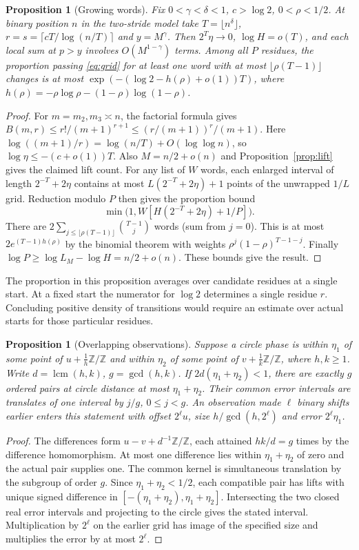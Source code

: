 \documentclass[11pt]{article}
\newtheorem{proposition}[theorem]{Proposition}
\DeclareMathOperator{\lcm}{lcm}
\newcommand{\Z}{\mathbb Z}
\begin{document}
\begin{proposition}[Growing words]\label{prop:entropy}
Fix $0<\gamma<\delta<1$, $c>\log 2$, $0<\rho<1/2$.
At binary position $n$ in the two-stride model take $T=\lfloor n^\delta\rfloor$,
$r=s=\lceil cT/\log(n/T)\rceil$ and $y=M^\gamma$. Then
$2^T\eta\to0$, $\log H=o(T)$, and each local sum at $p>y$ involves
$O(M^{1-\gamma})$ terms. Among all $P$ residues, the proportion passing
\eqref{eq:grid} for at least one word with at most
$\lfloor\rho(T-1)\rfloor$ changes is at most
$\exp(-(\log2-h(\rho)+o(1))T)$, where
$h(\rho)=-\rho\log\rho-(1-\rho)\log(1-\rho)$.
\end{proposition}
\begin{proof}
For $m=m_2,m_3\asymp n$, the factorial formula gives
$B(m,r)\le r!/(m+1)^{r+1}\le(r/(m+1))^r/(m+1)$.
Here $\log((m+1)/r)=\log(n/T)+O(\log\log n)$, so
$\log\eta\le-(c+o(1))T$. Also $M=n/2+o(n)$ and
Proposition~\ref{prop:lift} gives the claimed lift count. For any list
of $W$ words, each enlarged interval of length $2^{-T}+2\eta$ contains
at most $L(2^{-T}+2\eta)+1$ points of the unwrapped $1/L$ grid.
Reduction modulo $P$ then gives the proportion bound
\[
 \min\bigl(1,W[H(2^{-T}+2\eta)+1/P]\bigr).
\]
There are $2\sum_{j\le\lfloor\rho(T-1)\rfloor}\binom{T-1}j$ words (sum from
$j=0$). This is at most $2e^{(T-1)h(\rho)}$ by the binomial theorem
with weights $\rho^j(1-\rho)^{T-1-j}$. Finally $\log P\ge\log L_M-\log H=n/2+o(n)$. These bounds give the result.
\end{proof}

The proportion in this proposition averages over candidate residues at a
single start. At a fixed start the numerator for $\log 2$ determines a single residue $r$. Concluding
positive density of transitions would require an estimate over actual starts
for those particular residues.

\begin{proposition}[Overlapping observations]\label{prop:overlap}
Suppose a circle phase is within $\eta_1$ of some point of $u+\frac1h\Z/\Z$
and within $\eta_2$ of some point of $v+\frac1k\Z/\Z$, where $h,k\ge1$.
Write $d=\lcm(h,k)$, $g=\gcd(h,k)$. If $2d(\eta_1+\eta_2)<1$, there are
exactly $g$ ordered pairs at circle distance at most $\eta_1+\eta_2$.
Their common error intervals are translates of one interval by $j/g$,
$0\le j<g$. An observation made $\ell$ binary shifts earlier enters this
statement with offset $2^\ell u$, size $h/\gcd(h,2^\ell)$ and error
$2^\ell\eta_1$.
\end{proposition}
\begin{proof}
The differences form $u-v+d^{-1}\Z/\Z$, each attained $hk/d=g$ times
by the difference homomorphism. At most one difference lies within
$\eta_1+\eta_2$ of zero and the actual pair supplies one. The common kernel
is simultaneous translation by the subgroup of order $g$. Since
$\eta_1+\eta_2<1/2$, each compatible pair has lifts with unique signed
difference in $[-(\eta_1+\eta_2),\eta_1+\eta_2]$. Intersecting the two
closed real error intervals and projecting to the circle gives the stated
interval. Multiplication by $2^\ell$ on the earlier grid has image of the
specified size and multiplies the error by at most $2^\ell$.
\end{proof}
\end{document}
